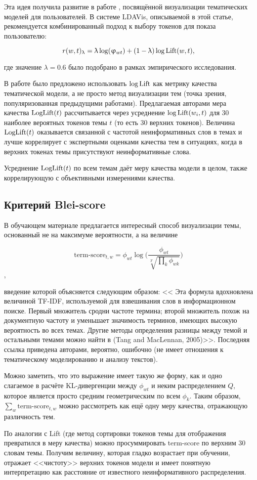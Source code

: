 Эта идея получила развитие в работе \cite{ldavis2014}, посвящённой визуализации тематических моделей для пользователей. В системе LDAVis, описываемой в этой статье, рекомендуется комбинированный подход к выбору токенов для показа пользователю:

$$r(w, t)_{\lambda} = \lambda \log(\phi_{wt}) + (1 - \lambda) \log \textup{Lift}(w, t),$$

где значение $\lambda = 0.6$ было подобрано в рамках эмпирического исследования.

В работе \cite{fan2019assessing} было предложено использовать $\log \textup{Lift}$ как метрику качества тематической модели, а не просто метод визуализации тем (точка зрения, популяризованная предыдущими работами). Предлагаемая авторами мера качества $\textup{LogLift}(t)$ рассчитывается через усреднение $\log \textup{Lift}(w_i, t)$ для 30 наиболее вероятных токенов темы $t$ (то есть 30 верхних токенов). Величина $\textup{LogLift}(t)$ оказывается связанной с частотой неинформативных слов в темах и лучше коррелирует с экспертными оценками качества тем в ситуациях, когда в верхних токенах темы присутствуют неинформативные слова.

Усреднение $\textup{LogLift}(t)$ по всем темам даёт меру качества модели в целом, также коррелирующую с объективными измерениями качества.

\subsection{Критерий Blei-score}

В обучающем материале \cite{Blei_lafferty} предлагается интересный способ визуализации темы, основанный не на максимуме вероятности, а на величине

$$\text{term-score}_{t,w} = \phi_{wt} \log \bigg( \frac{\phi_{wt}}{\sqrt[T]{\prod_k \phi_{wk}}}\bigg)$$,

введение которой объясняется следующим образом: <<
Эта формула вдохновлена величиной TF-IDF, используемой для взвешивания слов в информационном поиске. Первый
множитель сродни частоте термина; второй множитель похож
на документную частоту и уменьшает значимость терминов, имеющих высокую вероятность во всех темах. Другие методы определения разницы между
темой и остальными темами можно найти в (Tang and MacLennan, 2005)>>. Последняя ссылка приведена авторами, вероятно, ошибочно (не имеет отношения к тематическому моделированию и анализу текстов).

Можно заметить, что это выражение имеет такую же форму, как и одно слагаемое в расчёте KL-дивергенции между $\phi_{wt}$ и неким распределением $Q$, которое является просто средним геометрическим по всем $\phi_{k}$. Таким образом, $\sum_{w} \text{term-score}_{t,w}$ можно рассмотреть как ещё одну меру качества, отражающую различность тем.

По аналогии с Lift (где метод сортировки токенов темы для отображения превратился в меру качества) можно просуммировать term-score по верхним 30 словам темы. Получим величину, которая гладко возрастает при обучении, отражает <<чистоту>> верхних токенов модели и имеет понятную интерпретацию как расстояние от известного неинформативного распределения.


